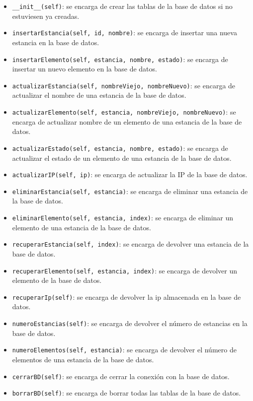 \begin{itemize}
	\item \verb|__init__(self)|: se encarga de crear las tablas de la base de datos si no estuviesen ya creadas.
	\item \verb|insertarEstancia(self, id, nombre)|: se encarga de insertar una nueva estancia en la base de datos.
	\item \verb|insertarElemento(self, estancia, nombre, estado)|: se encarga de insertar un nuevo elemento en la base de datos.
	\item \verb|actualizarEstancia(self, nombreViejo, nombreNuevo)|: se encarga de actualizar el nombre de una estancia de la base de datos.
	\item \verb|actualizarElemento(self, estancia, nombreViejo, nombreNuevo)|: se encarga de actualizar nombre de un elemento de una estancia de la base de datos.
	\item \verb|actualizarEstado(self, estancia, nombre, estado)|: se encarga de actualizar el estado de un elemento de una estancia de la base de datos.
	\item \verb|actualizarIP(self, ip)|: se encarga de actualizar la IP de la base de datos.
	\item \verb|eliminarEstancia(self, estancia)|: se encarga de eliminar una estancia de la base de datos.
	\item \verb|eliminarElemento(self, estancia, index)|: se encarga de eliminar un elemento de una estancia de la base de datos.
	\item \verb|recuperarEstancia(self, index)|: se encarga de devolver una estancia de la base de datos.
	\item \verb|recuperarElemento(self, estancia, index)|: se encarga de devolver un elemento de la base de datos.
	\item \verb|recuperarIp(self)|: se encarga de devolver la ip almacenada en la base de datos.
	\item \verb|numeroEstancias(self)|: se encarga de devolver el número de estancias en la base de datos.
	\item \verb|numeroElementos(self, estancia)|: se encarga de devolver el número de elementos de una estancia de la base de datos.
	\item \verb|cerrarBD(self)|: se encarga de cerrar la conexión con la base de datos.
	\item \verb|borrarBD(self)|: se encarga de borrar todas las tablas de la base de datos.
\end{itemize}

